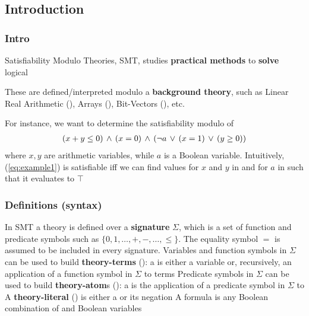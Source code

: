 \subsection{Introduction}

\begin{frame}
  \frametitle{Intro}

\scriptsize

Satisfiability Modulo Theories, SMT, studies {\bf practical methods} 
to {\bf solve} logical \formulae 

\vfill
\pause
These \formulae are defined/interpreted modulo a {\bf background theory},
such as Linear Real Arithmetic (\Lra), Arrays (\Arrays), Bit-Vectors (\Bitvectors), etc.

\vfill
\pause
For instance, we want to determine the satisfiability modulo \Lra of
\begin{eqnarray}
\label{eq:example1}
(x + y \leq 0) \,\wedge\, (x = 0) \,\wedge\, (\neg a \,\vee\, (x = 1) \,\vee\, (y \geq 0))
\end{eqnarray}
where $x, y$ are arithmetic variables, while $a$ is a Boolean variable. \pause
Intuitively, (\ref{eq:example1}) is satisfiable iff we can find values
for $x$ and $y$ in \Rea and for $a$ in \Boo such that it evaluates to $\top$

\end{frame}

\begin{frame}
  \frametitle{Definitions (syntax)}

  In SMT a theory \T is defined over a {\bf signature} $\Sigma$, which
  is a set of function and predicate symbols such as $\{ 0, 1, \ldots, +,-, \ldots, \leq \}$.
  The equality symbol $=$ is assumed to be included in every signature. 
  \pause
  \vfill
  Variables and function symbols in $\Sigma$ can be used to build {\bf theory-terms}
  (\tterm): a \tterm is either a variable or, recursively, an application
  of a function symbol in $\Sigma$ to terms
  \pause
  \vfill
  Predicate symbols in $\Sigma$ can be used to build {\bf theory-atom}s
  (\tatom): a \tatom is the application of a predicate symbol in $\Sigma$ 
  to \tterms
  \pause
  \vfill
  A {\bf theory-literal} (\tlit) is either a \tatom or its negation
  \pause
  \vfill
  A formula is any Boolean combination of \tatoms and Boolean variables
\end{frame}

